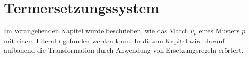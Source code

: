 


\section{Termersetzungssystem} \label{secTermersetzungssystem}

Im vorangehenden Kapitel wurde beschrieben, wie das Match $v_p$ eines Musters $p$ mit einem Literal $t$ gefunden werden kann. In diesem Kapitel wird darauf aufbauend die Transformation durch Anwendung von Ersetzungsregeln erörtert. 




